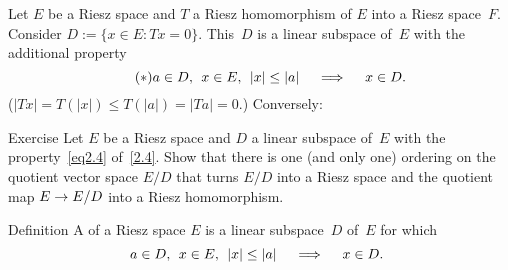 \documentclass[main.tex]{subfiles}
\begin{document}
%
%
\begin{psec}{2.4}%
Let $E$ be a Riesz space and $T$ a Riesz homomorphism of $E$
into a Riesz space~$F$.
Consider
 $D:=\{x\in E\colon Tx=0\}$.
This~$D$ is a linear subspace of~$E$ 
with the additional property
\begin{equation}
\tag{$*$}
\label{eq2.4}
a\in D\text{, }\; x\in E\text{, }\; |x|\leq |a| 
  \quad \implies \quad x\in D\text{. }
\end{equation}
($|Tx|=T(|x|)\leq T(|a|)=|Ta|=0$.)  
Conversely:
\end{psec}
%
%
\begin{psec}{2.5}{Exercise}
Let $E$ be a Riesz space and $D$ a linear subspace of~$E$
with the property~\eqref{eq2.4} of~\ref{2.4}.
Show that there is one (and only one)
ordering on the quotient vector space $E/D$ 
that turns $E/D$ into a Riesz space 
and the quotient map
$E\rightarrow E/D$ into a Riesz homomorphism.
\end{psec}
%
%
\begin{psec}{2.6}{Definition}
A  of a Riesz space $E$ 
is a linear subspace~$D$ of~$E$ for which
\begin{equation*}
a\in D\text{, }\; x\in E\text{, }\; |x|\leq |a| 
  \quad \implies \quad x\in D\text{. }
\end{equation*}
\end{psec}
\end{document}

